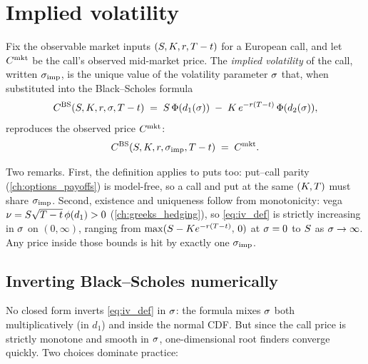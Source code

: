 \section{Implied volatility}
\label{sec:ch17_iv}

\begin{definition}
\label{def:implied_vol}
Fix the observable market inputs $(S, K, r, T -
t)$ for a European call, and let $C^{\text{mkt}}$ be the call's
observed mid-market price. The \emph{implied volatility} of the
call, written $\sigma_{\text{imp}}$, is the unique value of the
volatility parameter $\sigma$ that, when substituted into the
Black--Scholes formula
\begin{equation}
  C^{\text{BS}}(S,K,r,\sigma,T-t)
  \;=\; S\,\Phi(d_1(\sigma)) \;-\; K\,e^{-r(T-t)}\,\Phi(d_2(\sigma)),
  \label{eq:iv_def}
\end{equation}
reproduces the observed price $C^{\text{mkt}}$:
\begin{equation}
  C^{\text{BS}}(S,K,r,\sigma_{\text{imp}},T-t)
  \;=\; C^{\text{mkt}}.
  \label{eq:iv_equation}
\end{equation}
\end{definition}

Two remarks. First, the definition applies to puts too: put--call
parity (\cref{ch:options_payoffs}) is model-free, so a call and
put at the same $(K, T)$ must share
$\sigma_{\text{imp}}$. Second, existence and uniqueness follow
from monotonicity: vega
$\nu = S\sqrt{T-t}\,\phi(d_1) > 0$
(\cref{ch:greeks_hedging}), so \eqref{eq:iv_def} is strictly
increasing in $\sigma$ on $(0, \infty)$, ranging from
$\max(S - K e^{-r(T-t)},\,0)$ at $\sigma = 0$ to
$S$ as $\sigma \to \infty$. Any price inside those bounds is
hit by exactly one $\sigma_{\text{imp}}$.

\subsection{Inverting Black--Scholes numerically}
\label{subsec:ch17_inversion}

No closed form inverts \eqref{eq:iv_def} in $\sigma$: the formula
mixes $\sigma$ both multiplicatively (in $d_1$) and inside the
normal CDF. But since the call price is strictly monotone and
smooth in $\sigma$, one-dimensional root finders converge quickly.
Two choices dominate practice:


